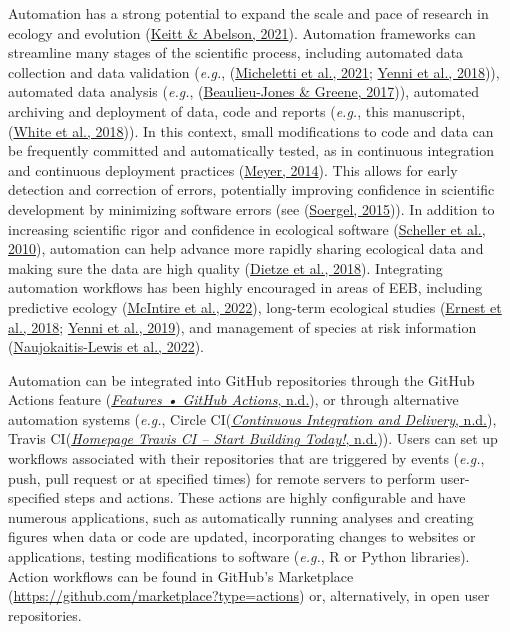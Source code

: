 Automation has a strong potential to expand the scale and pace of research in ecology and evolution (\protect\hyperlink{ref-cfgXxgt1}{Keitt \& Abelson, 2021}).
Automation frameworks can streamline many stages of the scientific process, including automated data collection and data validation (\emph{e.g.}, (\protect\hyperlink{ref-bhDgD6lF}{Micheletti et al., 2021}; \protect\hyperlink{ref-lXvpQxeN}{Yenni et al., 2018})), automated data analysis (\emph{e.g.}, (\protect\hyperlink{ref-Qh7xTLwz}{Beaulieu-Jones \& Greene, 2017})), automated archiving and deployment of data, code and reports (\emph{e.g.}, this manuscript, (\protect\hyperlink{ref-SirQKFIz}{White et al., 2018})).
In this context, small modifications to code and data can be frequently committed and automatically tested, as in continuous integration and continuous deployment practices (\protect\hyperlink{ref-1Ep9EJL6y}{Meyer, 2014}).
This allows for early detection and correction of errors, potentially improving confidence in scientific development by minimizing software errors (see (\protect\hyperlink{ref-ufw0ZdnI}{Soergel, 2015})).
In addition to increasing scientific rigor and confidence in ecological software (\protect\hyperlink{ref-12103x16N}{Scheller et al., 2010}), automation can help advance more rapidly sharing ecological data and making sure the data are high quality (\protect\hyperlink{ref-rTbinQMj}{Dietze et al., 2018}).
Integrating automation workflows has been highly encouraged in areas of EEB, including predictive ecology (\protect\hyperlink{ref-mmCOSRfr}{McIntire et al., 2022}), long-term ecological studies (\protect\hyperlink{ref-RxK4CmfR}{Ernest et al., 2018}; \protect\hyperlink{ref-1CJo8lo2v}{Yenni et al., 2019}), and management of species at risk information (\protect\hyperlink{ref-kZzfmBNu}{Naujokaitis-Lewis et al., 2022}).

Automation can be integrated into GitHub repositories through the GitHub Actions feature (\protect\hyperlink{ref-NUXbp429}{\emph{Features • GitHub Actions}, n.d.}), or through alternative automation systems (\emph{e.g.}, Circle CI(\protect\hyperlink{ref-T03Api6e}{\emph{Continuous Integration and Delivery}, n.d.}), Travis CI(\protect\hyperlink{ref-YeFSbfFV}{\emph{Homepage \textbar{} Travis CI -- Start Building Today!}, n.d.})).
Users can set up workflows associated with their repositories that are triggered by events (\emph{e.g.}, push, pull request or at specified times) for remote servers to perform user-specified steps and actions.
These actions are highly configurable and have numerous applications, such as automatically running analyses and creating figures when data or code are updated, incorporating changes to websites or applications, testing modifications to software (\emph{e.g.}, R or Python libraries).
Action workflows can be found in GitHub's Marketplace (\url{https://github.com/marketplace?type=actions}) or, alternatively, in open user repositories.

